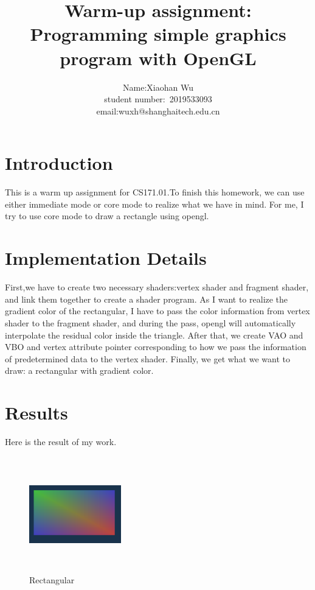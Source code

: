 \documentclass[acmtog]{acmart}
\title{Warm-up assignment:\\ {Programming simple graphics program with OpenGL}}
\author{Name:\quad Xiaohan Wu  \\ student number:\ 2019533093
\\email:\quad wuxh@shanghaitech.edu.cn}
\begin{document}
\maketitle

\vspace*{2 ex}

\section{Introduction}
This is a warm up assignment for CS171.01.To finish this homework, we can use either immediate mode or core mode to realize what we have in mind. For me, I try to use core mode to draw a rectangle using opengl.
\section{Implementation Details}
First,we have to create two necessary shaders:vertex shader and fragment shader, and link them together to create a shader program. As I want to realize the gradient color of the rectangular, I have to pass the color information from vertex shader to the fragment shader, and during the pass, opengl will automatically interpolate the residual color inside the triangle.
After that, we create VAO and VBO and vertex attribute pointer corresponding to how we pass the information of predetermined data to the vertex shader.
Finally, we get what we want to draw: a rectangular with gradient color.  
\section{Results}
Here is the result of my work.
\begin{figure}[h]
	\centering
	\includegraphics[width=4cm,height=5cm]{show.PNG}
	\caption{Rectangular}
\end{figure}
\end{document}
